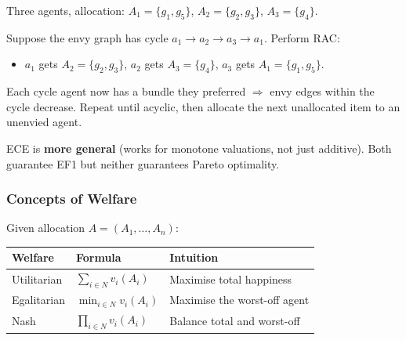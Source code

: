 \begin{exbox}
Three agents, allocation: $A_1 = \{g_1, g_5\}$, $A_2 = \{g_2, g_3\}$, $A_3 = \{g_4\}$.

Suppose the envy graph has cycle $a_1 \to a_2 \to a_3 \to a_1$. Perform RAC:
\begin{itemize}
  \item $a_1$ gets $A_2 = \{g_2, g_3\}$, \; $a_2$ gets $A_3 = \{g_4\}$, \; $a_3$ gets $A_1 = \{g_1, g_5\}$.
\end{itemize}
Each cycle agent now has a bundle they preferred $\Rightarrow$ envy edges within the cycle decrease. Repeat until acyclic, then allocate the next unallocated item to an unenvied agent.
\end{exbox}

\begin{tipbox}
ECE is \textbf{more general} (works for monotone valuations, not just additive). Both guarantee EF1 but neither guarantees Pareto optimality.
\end{tipbox}

\separator

\subsubsection{Concepts of Welfare}

\begin{defbox}
Given allocation $A = (A_1, \ldots, A_n)$:

\begin{center}
\renewcommand{\arraystretch}{1.4}
\begin{tabular}{lll}
\toprule
\textbf{Welfare} & \textbf{Formula} & \textbf{Intuition} \\
\midrule
Utilitarian & $\displaystyle\sum_{i \in N} v_i(A_i)$ & Maximise total happiness \\
Egalitarian & $\displaystyle\min_{i \in N} v_i(A_i)$ & Maximise the worst-off agent \\
Nash        & $\displaystyle\prod_{i \in N} v_i(A_i)$ & Balance total and worst-off \\
\bottomrule
\end{tabular}
\end{center}
\end{defbox}


